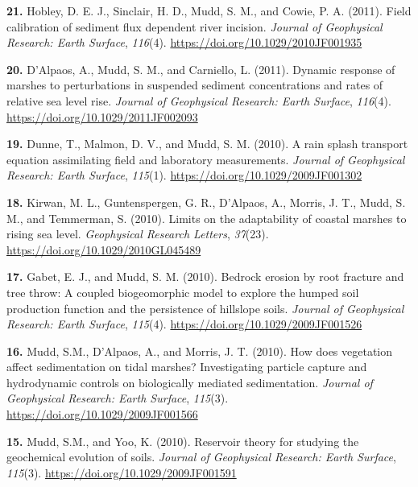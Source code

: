 \documentclass[10pt, a4paper]{article}
\newcommand{\years}[1]{\marginnote{\scriptsize #1}}
\begin{document}
\years{2011}\hangindent=0.7cm\textbf{21. }Hobley, D. E. J., Sinclair, H. D., Mudd, S. M., and Cowie, P. A. (2011). Field calibration of sediment flux dependent river incision. \textit{Journal of Geophysical Research: Earth Surface}, \textit{116}(4). \href{https://doi.org/10.1029/2010JF001935}{https://doi.org/10.1029/2010JF001935}\par
\years{2011}\hangindent=0.7cm\textbf{20. }D'Alpaos, A., Mudd, S. M., and Carniello, L. (2011). Dynamic response of marshes to perturbations in suspended sediment concentrations and rates of relative sea level rise. \textit{Journal of Geophysical Research: Earth Surface}, \textit{116}(4). \href{https://doi.org/10.1029/2011JF002093}{https://doi.org/10.1029/2011JF002093}\par


\years{2010}\hangindent=0.7cm\textbf{19. }Dunne, T., Malmon, D. V., and Mudd, S. M. (2010). A rain splash transport equation assimilating field and laboratory measurements. \textit{Journal of Geophysical Research: Earth Surface}, \textit{115}(1). \href{https://doi.org/10.1029/2009JF001302}{https://doi.org/10.1029/2009JF001302}\par
\years{2010}\hangindent=0.7cm\textbf{18. }Kirwan, M. L., Guntenspergen, G. R., D'Alpaos, A., Morris, J. T., Mudd, S. M., and Temmerman, S. (2010). Limits on the adaptability of coastal marshes to rising sea level. \textit{Geophysical Research Letters}, \textit{37}(23). \href{https://doi.org/10.1029/2010GL045489}{https://doi.org/10.1029/2010GL045489}\par
\years{2010}\hangindent=0.7cm\textbf{17. }Gabet, E. J., and Mudd, S. M. (2010). Bedrock erosion by root fracture and tree throw: A coupled biogeomorphic model to explore the humped soil production function and the persistence of hillslope soils. \textit{Journal of Geophysical Research: Earth Surface}, \textit{115}(4). \href{https://doi.org/10.1029/2009JF001526}{https://doi.org/10.1029/2009JF001526}\par
\years{2010}\hangindent=0.7cm\textbf{16. }Mudd, S.M., D'Alpaos, A., and Morris, J. T. (2010). How does vegetation affect sedimentation on tidal marshes? Investigating particle capture and hydrodynamic controls on biologically mediated sedimentation. \textit{Journal of Geophysical Research: Earth Surface}, \textit{115}(3). \href{https://doi.org/10.1029/2009JF001566}{https://doi.org/10.1029/2009JF001566}\par
\years{2010}\hangindent=0.7cm\textbf{15. }Mudd, S.M., and Yoo, K. (2010). Reservoir theory for studying the geochemical evolution of soils. \textit{Journal of Geophysical Research: Earth Surface}, \textit{115}(3). \href{https://doi.org/10.1029/2009JF001591}{https://doi.org/10.1029/2009JF001591}\par
\end{document}
